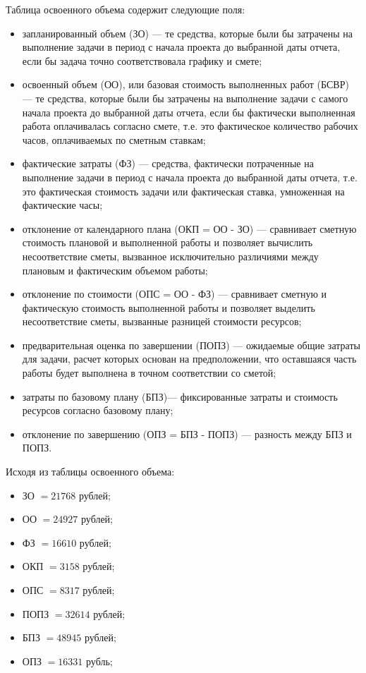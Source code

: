 Таблица освоенного объема содержит следующие поля:
\begin{itemize}
	\item запланированный объем (ЗО) --- те средства, которые были бы затрачены на выполнение задачи в период с начала проекта до выбранной даты отчета, если бы задача точно соответствовала графику и смете;
	\item освоенный объем (ОО), или базовая стоимость выполненных работ (БСВР) --- те средства, которые были бы затрачены на выполнение задачи с самого начала проекта до выбранной даты отчета, если бы фактически выполненная работа оплачивалась согласно смете, т.е. это фактическое количество рабочих часов, оплачиваемых по сметным ставкам;
	\item фактические затраты (ФЗ) --- средства, фактически потраченные на выполнение задачи в период с начала
	проекта до выбранной даты отчета, т.е. это фактическая стоимость задачи или фактическая ставка, умноженная на фактические часы;
	\item отклонение от календарного плана (ОКП = ОО - ЗО) --- сравнивает сметную стоимость плановой и выполненной работы и позволяет вычислить несоответствие сметы, вызванное исключительно различиями между плановым и фактическим объемом работы;
	\item отклонение по стоимости (ОПС = ОО - ФЗ) --- сравнивает сметную и фактическую стоимость выполненной работы и позволяет выделить несоответствие сметы, вызванные разницей стоимости ресурсов;
	\item предварительная оценка по завершении (ПОПЗ) --- ожидаемые общие затраты для задачи, расчет которых основан на предположении, что оставшаяся часть работы будет выполнена в точном соответствии со сметой;
	\item затраты по базовому плану (БПЗ)--- фиксированные затраты и стоимость ресурсов согласно базовому плану;
	\item отклонение по завершению (ОПЗ = БПЗ - ПОПЗ) --- разность между БПЗ и ПОПЗ.
\end{itemize}

Исходя из таблицы освоенного объема:
\begin{itemize}[]
	\item ЗО $= 21768$ рублей;
	\item ОО $= 24927$ рублей;
	\item ФЗ $= 16610$ рублей;
	\item ОКП $= 3158$ рублей;
	\item ОПС $= 8317$ рублей;
	\item ПОПЗ $= 32614$ рублей;
	\item БПЗ $= 48945$ рублей;
	\item ОПЗ $= 16331$ рубль;
\end{itemize}

